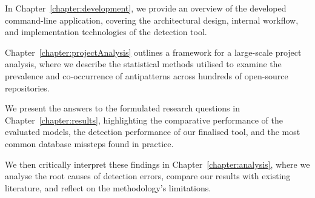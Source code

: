 In Chapter~\ref{chapter:development}, we provide an overview of the developed command-line application, covering the architectural design, internal workflow, and implementation technologies of the detection tool. 

Chapter~\ref{chapter:projectAnalysis} outlines a framework for a large-scale project analysis, where we describe the statistical methods utilised to examine the prevalence and co-occurrence of antipatterns across hundreds of open-source repositories. 

We present the answers to the formulated research questions in Chapter~\ref{chapter:results}, highlighting the comparative performance of the evaluated models, the detection performance of our finalised tool, and the most common database missteps found in practice. 

We then critically interpret these findings in Chapter~\ref{chapter:analysis}, where we analyse the root causes of detection errors, compare our results with existing literature, and reflect on the methodology's limitations. 
